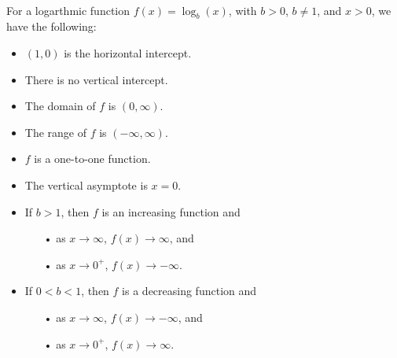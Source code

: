 \begin{myDefinition}~\\[0.5mm]
For a logarthmic function $f(x) = \log_b(x)$, with $b> 0$, $b\neq1$, and $x>0$, we have the following:\\[3mm]
\begin{minipage}{0.6\linewidth}
	\begin{itemize}
	\setlength{\itemsep}{1mm}
		\item $(1,0)$ is the horizontal intercept.
		\item There is no vertical intercept.
		\item The domain of $f$ is $(0, \infty)$.
		\item The range of $f$ is $(-\infty,\infty)$.
		\item $f$ is a one-to-one function.
		\item The vertical asymptote is $x=0$.
		\item If $b>1$, then $f$ is an increasing function and
			\begin{itemize}
			\setlength{\itemsep}{0in}
				\item[\small{•}] as $x\rightarrow \infty$, $f(x)\rightarrow \infty$, and
				\item[\small{•}] as $x\rightarrow 0^+$, $f(x)\rightarrow -\infty$.
			\end{itemize}	
		\item If $0<b<1$, then $f$ is a decreasing function and
			\begin{itemize}
			\setlength{\itemsep}{0in}
				\item[\small{•}] as $x\rightarrow \infty$, $f(x)\rightarrow -\infty$, and
				\item[\small{•}] as $x\rightarrow 0^+$, $f(x)\rightarrow \infty$.
			\end{itemize}	
	\end{itemize}
	\end{minipage}
	\begin{minipage}{0.4\linewidth}
			\begin{center}
			~\\[-0.8em]
				\label{fig:log-def1}


\end{center}
\end{minipage}
\end{myDefinition}
